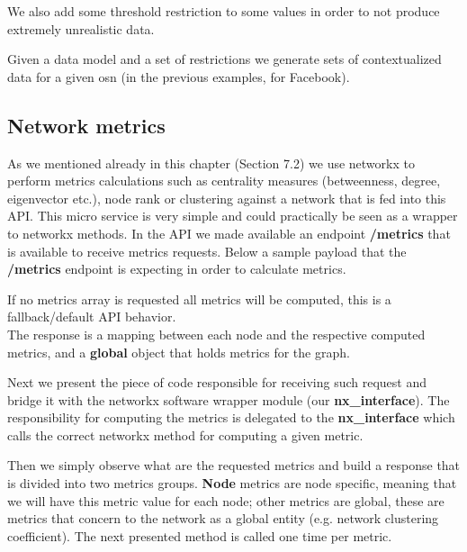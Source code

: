 We also add some threshold restriction to some values in order to not produce extremely unrealistic data.



Given a data model and a set of restrictions we generate sets of contextualized data for a given \gls{osn} (in the previous examples, for Facebook).

\subsection{Network metrics}
As we mentioned already in this chapter (Section 7.2) we use networkx \citep{hagberg2013networkx} to perform metrics calculations such as centrality measures (betweenness, degree, eigenvector etc.), node rank or clustering against a network that is fed into this API. This micro service is very simple and could practically be seen as a wrapper to networkx methods. In the API we made available an endpoint \textbf{/metrics} that is available to receive metrics requests. Below a sample payload that the \textbf{/metrics} endpoint is expecting in order to calculate metrics.



If no metrics array is requested all metrics will be computed, this is a fallback/default API behavior.\\
\indent The response is a mapping between each node and the respective computed metrics, and a \textbf{global} object that holds metrics for the graph.



Next we present the piece of code responsible for receiving such request and bridge it with the networkx software wrapper module (our \textbf{nx\_interface}). The responsibility for computing the metrics is delegated to the \textbf{nx\_interface} which calls the correct networkx method for computing a given metric.



Then we simply observe what are the requested metrics and build a response that is divided into two metrics groups. \textbf{Node} metrics are node specific, meaning that we will have this metric value for each node; other metrics are global, these are metrics that concern to the network as a global entity (e.g. network clustering coefficient). The next presented method is called one time per metric.


